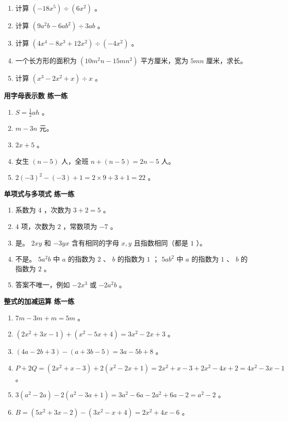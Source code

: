 \begin{practice}


\begin{enumerate}
  \item 计算 $(-18x^5) \div (6x^2)$ 。
  \item 计算 $(9a^2b - 6ab^2) \div 3ab$ 。
  \item 计算 $(4x^4 - 8x^3 + 12x^2) \div (-4x^2)$ 。
  \item 一个长方形的面积为 $(10m^2n - 15mn^2)$ 平方厘米，宽为 $5mn$ 厘米，求长。
  \item 计算 $(x^3 - 2x^2 + x) \div x$ 。
\end{enumerate}


\end{practice}



\begin{answer}


\textbf{用字母表示数 练一练}

\begin{enumerate}
  \item $S = \frac{1}{2}ah$ 。
  \item $m - 3n$ 元。
  \item $2x + 5$ 。
  \item 女生 $(n - 5)$ 人，全班 $n + (n - 5) = 2n - 5$ 人。
  \item $2(-3)^2 - (-3) + 1 = 2 \times 9 + 3 + 1 = 22$ 。
\end{enumerate}


\textbf{单项式与多项式 练一练}

\begin{enumerate}
  \item 系数为 $4$ ，次数为 $3 + 2 = 5$ 。
  \item $4$ 项，次数为 $2$ ，常数项为 $-7$ 。
  \item 是。 $2xy$ 和 $-3yx$ 含有相同的字母 $x, y$ 且指数相同（都是 $1$ ）。
  \item 不是。 $5a^2b$ 中 $a$ 的指数为 $2$ 、 $b$ 的指数为 $1$ ； $5ab^2$ 中 $a$ 的指数为 $1$ 、 $b$ 的指数为 $2$ 。
  \item 答案不唯一，例如 $-2x^3$ 或 $-2a^2b$ 。
\end{enumerate}


\textbf{整式的加减运算 练一练}

\begin{enumerate}
  \item $7m - 3m + m = 5m$ 。
  \item $(2x^2 + 3x - 1) + (x^2 - 5x + 4) = 3x^2 - 2x + 3$ 。
  \item $(4a - 2b + 3) - (a + 3b - 5) = 3a - 5b + 8$ 。
  \item $P + 2Q = (2x^2 + x - 3) + 2(x^2 - 2x + 1) = 2x^2 + x - 3 + 2x^2 - 4x + 2 = 4x^2 - 3x - 1$ 。
  \item $3(a^2 - 2a) - 2(a^2 - 3a + 1) = 3a^2 - 6a - 2a^2 + 6a - 2 = a^2 - 2$ 。
  \item $B = (5x^2 + 3x - 2) - (3x^2 - x + 4) = 2x^2 + 4x - 6$ 。
\end{enumerate}



\end{answer}

